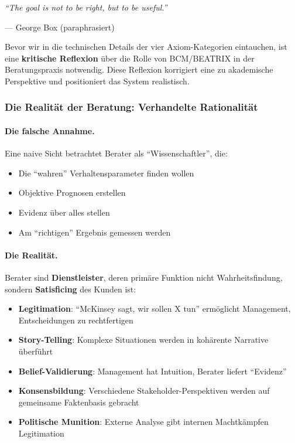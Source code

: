 \epigraph{\textit{``The goal is not to be right, but to be useful.''}}{--- George Box (paraphrasiert)}

Bevor wir in die technischen Details der vier Axiom-Kategorien eintauchen, ist eine \textbf{kritische Reflexion} über die Rolle von BCM/BEATRIX in der Beratungspraxis notwendig. Diese Reflexion korrigiert eine zu akademische Perspektive und positioniert das System realistisch.

\subsubsection{Die Realität der Beratung: Verhandelte Rationalität}

\paragraph{Die falsche Annahme.}
Eine naive Sicht betrachtet Berater als ``Wissenschaftler'', die:
\begin{itemize}
    \item Die ``wahren'' Verhaltensparameter finden wollen
    \item Objektive Prognosen erstellen
    \item Evidenz über alles stellen
    \item Am ``richtigen'' Ergebnis gemessen werden
\end{itemize}

\paragraph{Die Realität.}
Berater sind \textbf{Dienstleister}, deren primäre Funktion nicht Wahrheitsfindung, sondern \textbf{Satisficing} des Kunden ist:
\begin{itemize}
    \item \textbf{Legitimation}: ``McKinsey sagt, wir sollen X tun'' ermöglicht Management, Entscheidungen zu rechtfertigen
    \item \textbf{Story-Telling}: Komplexe Situationen werden in kohärente Narrative überführt
    \item \textbf{Belief-Validierung}: Management hat Intuition, Berater liefert ``Evidenz''
    \item \textbf{Konsensbildung}: Verschiedene Stakeholder-Perspektiven werden auf gemeinsame Faktenbasis gebracht
    \item \textbf{Politische Munition}: Externe Analyse gibt internen Machtkämpfen Legitimation
\end{itemize}

